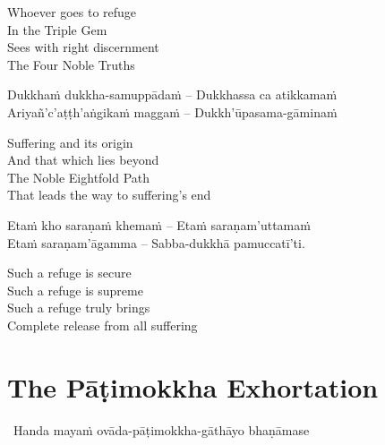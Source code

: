 \begin{english-verses}
  Whoever goes to refuge\\
  In the Triple Gem\\
  Sees with right discernment\\
  The Four Noble Truths
\end{english-verses}

\begin{verses}
  Dukkhaṁ dukkha-samuppādaṁ – Dukkhassa ca atikkamaṁ\\
  Ariyañ'c'aṭṭh'aṅgikaṁ maggaṁ – Dukkh'ūpasama-gāminaṁ
\end{verses}

\begin{english-verses}
  Suffering and its origin\\
  And that which lies beyond\\
  The Noble Eightfold Path\\
  That leads the way to suffering's end
\end{english-verses}

\begin{verses}
  Etaṁ kho saraṇaṁ khemaṁ – Etaṁ saraṇam'uttamaṁ\\
  Etaṁ saraṇam'āgamma – Sabba-dukkhā pamuccatī'ti.
\end{verses}

\begin{english-verses}
  Such a refuge is secure\\
  Such a refuge is supreme\\
  Such a refuge truly brings\\
  Complete release from all suffering
\end{english-verses}

\suttaRef{[Dhp 188-192]}


\section{The Pāṭimokkha Exhortation}
\label{patimokkha-exhortation}

\begin{leader}
  \anglebracketleft\ \hspace{-0.5mm}Handa mayaṁ ovāda-pāṭimokkha-gāthāyo bhaṇāmase \hspace{-0.5mm}\anglebracketright\
\end{leader}

